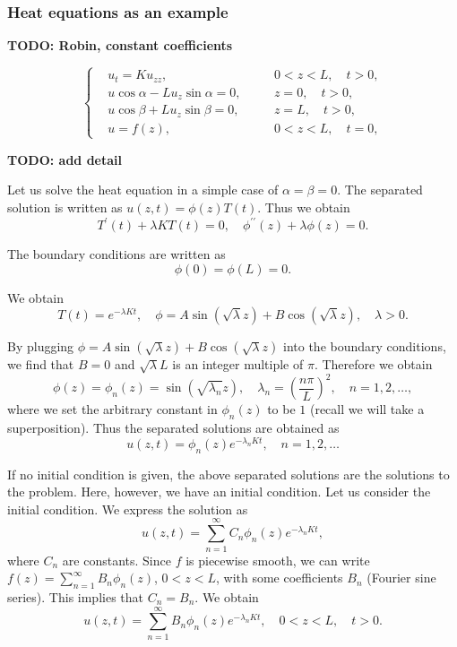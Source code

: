 \subsubsection{Heat equations as an example}

\textbf{TODO: Robin, constant coefficients}

\begin{equation}
    \left\{\begin{aligned} 
        &u_t=K u_{z z}, && 0<z<L, \quad t>0, 
        \\ 
        &u \cos \alpha-L u_z \sin \alpha=0,\quad && z=0, \quad t>0, 
        \\ 
        &u \cos \beta+L u_z \sin \beta=0, && z=L, \quad t>0, 
        \\
        &u=f(z), && 0<z<L, \quad t=0,
    \end{aligned}\right.
\end{equation}

\textbf{TODO: add detail}

Let us solve the heat equation in a simple case of $\alpha=\beta=0$. The separated solution is written as $u(z, t)=\phi(z) T(t)$. Thus we obtain
$$
T^{\prime}(t)+\lambda K T(t)=0, \quad \phi^{\prime \prime}(z)+\lambda \phi(z)=0 .
$$

The boundary conditions are written as
$$
\phi(0)=\phi(L)=0 .
$$

We obtain
$$
T(t)=e^{-\lambda K t}, \quad \phi=A \sin (\sqrt{\lambda} z)+B \cos (\sqrt{\lambda} z), \quad \lambda>0 .
$$

By plugging $\phi=A \sin (\sqrt{\lambda} z)+B \cos (\sqrt{\lambda} z)$ into the boundary conditions, we find that $B=0$ and $\sqrt{\lambda} L$ is an integer multiple of $\pi$. Therefore we obtain
$$
\phi(z)=\phi_n(z)=\sin \left(\sqrt{\lambda_n} z\right), \quad \lambda_n=\left(\frac{n \pi}{L}\right)^2, \quad n=1,2, \ldots,
$$
where we set the arbitrary constant in $\phi_n(z)$ to be $1$ (recall we will take a superposition). Thus the separated solutions are obtained as
$$
u(z, t)=\phi_n(z) e^{-\lambda_n K t}, \quad n=1,2, \ldots
$$

If no initial condition is given, the above separated solutions are the solutions to the problem. Here, however, we have an initial condition.
Let us consider the initial condition. We express the solution as
$$
u(z, t)=\sum_{n=1}^{\infty} C_n \phi_n(z) e^{-\lambda_n K t},
$$
where $C_n$ are constants. Since $f$ is piecewise smooth, we can write $f(z)=\sum_{n=1}^{\infty} B_n \phi_n(z)$, $0<z<L$, with some coefficients $B_n$ (Fourier sine series). This implies that $C_n=B_n$. We obtain
$$
u(z, t)=\sum_{n=1}^{\infty} B_n \phi_n(z) e^{-\lambda_n K t}, \quad 0<z<L, \quad t>0 .
$$

